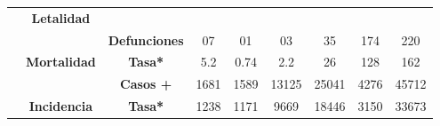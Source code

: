 \begin{tabular}{ccc|cccccc|}
		&\multicolumn{1}{c|}{\multirow{-2}{*}{\cellcolor[HTML]{E2EFDA}\textbf{Letalidad}}}&\cellcolor[HTML]{E2EFDA} 
		&\multicolumn{1}{c|}{\cellcolor[HTML]{E2EFDA}} 
		&\multicolumn{1}{c|}{\cellcolor[HTML]{E2EFDA}} 
		&\multicolumn{1}{c|}{\cellcolor[HTML]{E2EFDA}} 
		&\multicolumn{1}{c|}{\cellcolor[HTML]{E2EFDA}} 
		&\multicolumn{1}{c|}{\cellcolor[HTML]{E2EFDA}} 
		&\cellcolor[HTML]{E2EFDA} \\ \cline{2-2}
		\rowcolor[HTML]{E2EFDA} 
		\multicolumn{1}{|c|}{\cellcolor[HTML]{E2EFDA}} 
		&\multicolumn{1}{c|}{\cellcolor[HTML]{E2EFDA}} 
		&\multirow{-2}{*}{\cellcolor[HTML]{E2EFDA}\textbf{Defunciones}} 
		&\multicolumn{1}{c|}{\multirow{-2}{*}{\cellcolor[HTML]{E2EFDA}07}} 
		&\multicolumn{1}{c|}{\multirow{-2}{*}{\cellcolor[HTML]{E2EFDA}01}} 
		&\multicolumn{1}{c|}{\multirow{-2}{*}{\cellcolor[HTML]{E2EFDA}03}} 
		&\multicolumn{1}{c|}{\multirow{-2}{*}{\cellcolor[HTML]{E2EFDA}35}} 
		&\multicolumn{1}{c|}{\multirow{-2}{*}{\cellcolor[HTML]{E2EFDA}174}} 
		&\multirow{-2}{*}{\cellcolor[HTML]{E2EFDA}220} \\ \cline{3-9} 
		\rowcolor[HTML]{E2EFDA} 
		\multicolumn{1}{|c|}{\cellcolor[HTML]{E2EFDA}} &
		\multicolumn{1}{c|}{\multirow{-2}{*}{\cellcolor[HTML]{E2EFDA}\textbf{Mortalidad}}}&\textbf{Tasa*} 
		&\multicolumn{1}{c|}{\cellcolor[HTML]{E2EFDA}5.2} 
		&\multicolumn{1}{c|}{\cellcolor[HTML]{E2EFDA}0.74} 
		&\multicolumn{1}{c|}{\cellcolor[HTML]{E2EFDA}2.2} 
		&\multicolumn{1}{c|}{\cellcolor[HTML]{E2EFDA}26} 
		&\multicolumn{1}{c|}{\cellcolor[HTML]{E2EFDA}128} 
		&162 \\ \cline{2-9} 
		\rowcolor[HTML]{E2EFDA} 
		\multicolumn{1}{|c|}{\cellcolor[HTML]{E2EFDA}} &
		\multicolumn{1}{c|}{\cellcolor[HTML]{E2EFDA}} &
		\textbf{Casos +} &
		\multicolumn{1}{c|}{\cellcolor[HTML]{E2EFDA}1681} &
		\multicolumn{1}{c|}{\cellcolor[HTML]{E2EFDA}1589} &
		\multicolumn{1}{c|}{\cellcolor[HTML]{E2EFDA}13125} &
		\multicolumn{1}{c|}{\cellcolor[HTML]{E2EFDA}25041} &
		\multicolumn{1}{c|}{\cellcolor[HTML]{E2EFDA}4276} &
		45712 \\ \cline{3-9} 
		\rowcolor[HTML]{E2EFDA} 
		\multicolumn{1}{|c|}{\multirow{-6}{*}{\cellcolor[HTML]{E2EFDA}\textbf{2022}}} &
		\multicolumn{1}{c|}{\multirow{-2}{*}{\cellcolor[HTML]{E2EFDA}\textbf{Incidencia}}} &
		\textbf{Tasa*} &
		\multicolumn{1}{c|}{\cellcolor[HTML]{E2EFDA}1238} &
		\multicolumn{1}{c|}{\cellcolor[HTML]{E2EFDA}1171} &
		\multicolumn{1}{c|}{\cellcolor[HTML]{E2EFDA}9669} &
		\multicolumn{1}{c|}{\cellcolor[HTML]{E2EFDA}18446} &
		\multicolumn{1}{c|}{\cellcolor[HTML]{E2EFDA}3150} &
		33673 \\ \hline
	\end{tabular}
